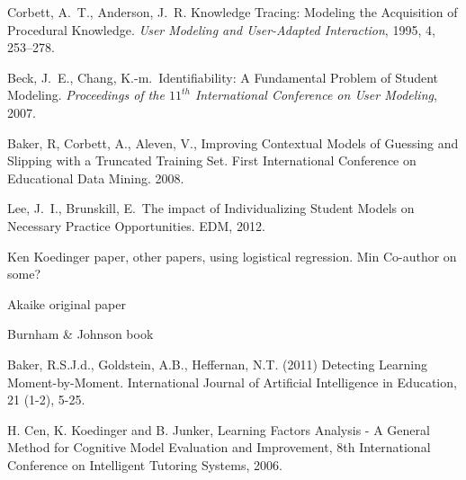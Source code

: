 \documentclass[11pt,letterpaper]{article}
\begin{document}
\begin{thebibliography}{9}

  Corbett, A.\ T., Anderson, J.\ R. Knowledge Tracing:  Modeling 
the Acquisition of Procedural Knowledge.  \emph{User Modeling and
 User-Adapted Interaction}, 1995, 4, 253--278.

  Beck, J.\ E., Chang, K.-m.\ Identifiability: A Fundamental Problem of
  Student Modeling.
  \emph{Proceedings of the $11^{th}$ International Conference on User 
    Modeling}, 2007.

 Baker, R, Corbett, A., Aleven, V.,  Improving Contextual 
    Models of Guessing and Slipping with a Truncated Training Set. 
    First International Conference on Educational Data Mining. 2008. 

   Lee, J.\ I., Brunskill, E.\ The impact of Individualizing Student 
  Models on Necessary Practice Opportunities.  EDM, 2012.

  Ken Koedinger paper, other papers, using logistical regression.
  Min Co-author on some?

   Akaike original paper

   Burnham \& Johnson book

   Baker, R.S.J.d., Goldstein, A.B., Heffernan, N.T. (2011) 
     Detecting Learning Moment-by-Moment. International Journal of 
    Artificial Intelligence in Education, 21 (1-2), 5-25.

  H. Cen, K. Koedinger and B. Junker, Learning Factors Analysis - A General Method for Cognitive Model Evaluation and Improvement, 8th International Conference on Intelligent Tutoring Systems, 2006. 

\end{thebibliography}
\end{document}
